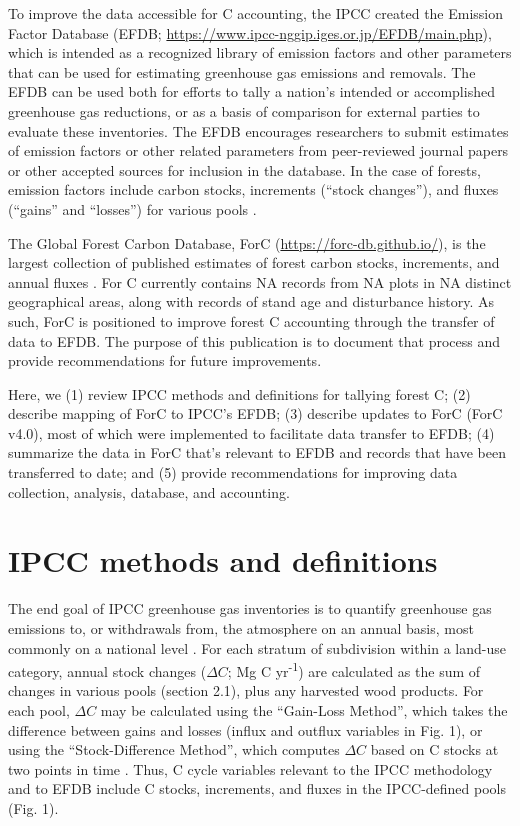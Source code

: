 \documentclass[, manuscript]{copernicus}
\begin{document}
To improve the data accessible for C accounting, the IPCC created the
Emission Factor Database (EFDB;
\url{https://www.ipcc-nggip.iges.or.jp/EFDB/main.php}), which is
intended as a recognized library of emission factors and other
parameters that can be used for estimating greenhouse gas emissions and
removals. The EFDB can be used both for efforts to tally a nation's
intended or accomplished greenhouse gas reductions, or as a basis of
comparison for external parties to evaluate these inventories. The EFDB
encourages researchers to submit estimates of emission factors or other
related parameters from peer-reviewed journal papers or other accepted
sources for inclusion in the database. In the case of forests, emission
factors include carbon stocks, increments (``stock changes''), and
fluxes (``gains'' and ``losses'') for various pools
\citep{ipcc_2006_2006, ipcc_2019_2019}.

The Global Forest Carbon Database, ForC
(\url{https://forc-db.github.io/}), is the largest collection of
published estimates of forest carbon stocks, increments, and annual
fluxes
\citep{anderson-teixeira_forc_2018, anderson-teixeira_carbon_2021}. For
C currently contains NA records from NA plots in NA distinct
geographical areas, along with records of stand age and disturbance
history. As such, ForC is positioned to improve forest C accounting
through the transfer of data to EFDB. The purpose of this publication is
to document that process and provide recommendations for future
improvements.

Here, we (1) review IPCC methods and definitions for tallying forest C;
(2) describe mapping of ForC to IPCC's EFDB; (3) describe updates to
ForC (ForC v4.0), most of which were implemented to facilitate data
transfer to EFDB; (4) summarize the data in ForC that's relevant to EFDB
and records that have been transferred to date; and (5) provide
recommendations for improving data collection, analysis, database, and
accounting.

\section{IPCC methods and definitions}

The end goal of IPCC greenhouse gas inventories is to quantify
greenhouse gas emissions to, or withdrawals from, the atmosphere on an
annual basis, most commonly on a national level
\citep{ipcc_2006_2006, ipcc_2019_2019}. For each stratum of subdivision
within a land-use category, annual stock changes (\(\Delta C\); Mg C
yr\textsuperscript{-1}) are calculated as the sum of changes in various
pools (section 2.1), plus any harvested wood products. For each pool,
\(\Delta C\) may be calculated using the ``Gain-Loss Method'', which
takes the difference between gains and losses (influx and outflux
variables in Fig. 1), or using the ``Stock-Difference Method'', which
computes \(\Delta C\) based on C stocks at two points in time
\citep{ipcc_2006_2006}. Thus, C cycle variables relevant to the IPCC
methodology and to EFDB include C stocks, increments, and fluxes in the
IPCC-defined pools (Fig. 1).
\end{document}
